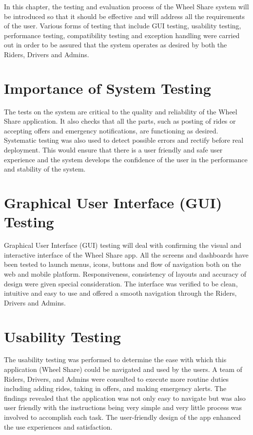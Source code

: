 In this chapter, the testing and evaluation process of the Wheel Share system will be introduced so that it should be effective and will address all the requirements of the user. Various forms of testing that include GUI testing, usability testing, performance testing, compatibility testing and exception handling were carried out in order to be assured that the system operates as desired by both the Riders, Drivers and Admins. 
\section{Importance of System Testing}
The tests on the system are critical to the quality and reliability of the Wheel Share application. It also checks that all the parts, such as posting of rides or accepting offers and emergency notifications, are functioning as desired. Systematic testing was also used to detect possible errors and rectify before real deployment. This would ensure that there is a user friendly and safe user experience and the system develops the confidence of the user in the performance and stability of the system\cite{chaudhry2018}.

\section{Graphical User Interface (GUI) Testing}
Graphical User Interface (GUI) testing will deal with confirming the visual and interactive interface of the Wheel Share app. All the screens and dashboards have been tested to launch menus, icons, buttons and flow of navigation both on the web and mobile platform. Responsiveness, consistency of layouts and accuracy of design were given special consideration. The interface was verified to be clean, intuitive and easy to use and offered a smooth navigation through the Riders, Drivers and Admins. 

\section{Usability Testing}
The usability testing was performed to determine the ease with which this application (Wheel Share) could be navigated and used by the users. A team of Riders, Drivers, and Admins were consulted to execute more routine duties including adding rides, taking in offers, and making emergency alerts. The findings revealed that the application was not only easy to navigate but was also user friendly with the instructions being very simple and very little process was involved to accomplish each task. The user-friendly design of the app enhanced the use experiences and satisfaction. 

